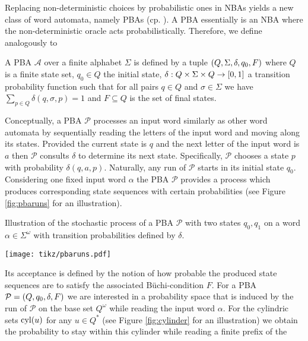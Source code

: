 Replacing non-deterministic choices by probabilistic ones in \acp{NBA} yields
a new class of word automata, namely \aclp{PBA} (cp. \cite{RecOmeLangProbAuto,%
DecProblemsForProbAuto,Groesser}). A \ac{PBA} essentially is an \ac{NBA} where
the non-deterministic oracle acts probabilistically. Therefore, we define
analogously to \cite{Groesser}
\begin{definition}
  A \ac{PBA} $\mathcal{A}$ over a finite alphabet $\Sigma$ is defined by a
  tuple $\left(Q, \Sigma, \delta, q_{0}, F\right)$ where $Q$ is a finite state set,
  $q_{0}\in Q$ the initial state,
    $\delta:Q\times\Sigma\times Q\rightarrow \left[0,1\right]$
  a transition probability function such that for all pairs $q\in Q$ and
  $\sigma\in\Sigma$ we have $\sum_{p\in Q}\delta(q,\sigma,p) = 1$
  and $F\subseteq Q$ is the set of final states.
\end{definition}
Conceptually, a \ac{PBA} $\mathcal{P}$ processes an input word similarly as 
other word automata by sequentially reading the letters of the input word and 
moving along its states. Provided the current state is $q$ and the next letter 
of the input word is $a$ then $\mathcal{P}$ consults $\delta$ to determine its 
next state. Specifically, $\mathcal{P}$ chooses a state $p$ with probability
$\delta(q,a,p)$. Naturally, any run of $\mathcal{P}$ starts in its initial
state $q_{0}$. Considering one fixed input word $\alpha$ the \ac{PBA} 
$\mathcal{P}$ provides a process which produces corresponding state sequences 
with certain probabilities (see Figure \ref{fig:pbaruns} for an illustration).
\begin{drawing}
  \caption{Illustration of the stochastic process of a \ac{PBA} $\mathcal{P}$
  with two states $q_{0}, q_{1}$ on a word $\alpha\in\Sigma^{\omega}$ with
  transition probabilities defined by $\delta$.}
  \label{fig:pbaruns}
  \begin{center}
    \texttt{[image: tikz/pbaruns.pdf]}
  \end{center}
\end{drawing}
Its acceptance is defined by the notion of how probable the produced state
sequences are to satisfy the associated Büchi-condition $F$. For a \ac{PBA} 
$\mathcal{P} = \left(Q, q_{0}, \delta, F\right)$ we are interested in a probability 
space that is induced by the run of $\mathcal{P}$ on the base set $Q^{\omega}$ 
while reading the input word $\alpha$. For the cylindric sets $\operatorname{cyl}(u)$ for any
$u\in Q^{*}$ (see Figure \ref{fig:cylinder} for an illustration) we obtain the
probability to stay within this cylinder while reading a finite prefix of the
